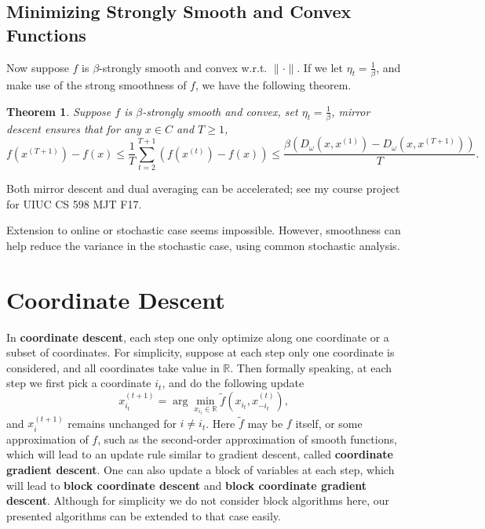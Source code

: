 \documentclass[openany]{book}
\newtheorem{theorem}{Theorem}[chapter]
\theoremstyle{definition}
\theoremstyle{remark}
\begin{document}
\section{Minimizing Strongly Smooth and Convex Functions}
Now suppose $f$ is $\beta$-strongly smooth and convex w.r.t. $\|\cdot\|$. If we let $\eta_t=\frac{1}{\beta}$, and make use of the strong smoothness of $f$, we have the following theorem.
\begin{theorem}
    Suppose $f$ is $\beta$-strongly smooth and convex, set $\eta_t=\frac{1}{\beta}$, mirror descent ensures that for any $x\in C$ and $T\ge1$,
    \begin{equation*}
        f(x^{(T+1)})-f(x)\le\frac{1}{T}\sum_{t=2}^{T+1}\left(f(x^{(t)})-f(x)\right)\le \frac{\beta\left(D_{\omega}(x,x^{(1)})-D_{\omega}(x,x^{(T+1)})\right)}{T}.
    \end{equation*}
\end{theorem}

Both mirror descent and dual averaging can be accelerated; see my course project for UIUC CS 598 MJT F17.

Extension to online or stochastic case seems impossible. However, smoothness can help reduce the variance in the stochastic case, using common stochastic analysis.

\chapter{Coordinate Descent}
In \textbf{coordinate descent}, each step one only optimize along one coordinate or a subset of coordinates. For simplicity, suppose at each step only one coordinate is considered, and all coordinates take value in $\mathbb{R}$. Then formally speaking, at each step we first pick a coordinate $i_t$, and do the following update
\begin{equation}
    x^{(t+1)}_{i_t}=\arg\min_{x_{i_t}\in \mathbb{R}}\tilde{f}(x_{i_t},x^{(t)}_{-i_t}),
\end{equation}
and $x^{(t+1)}_i$ remains unchanged for $i\ne i_t$. Here $\tilde{f}$ may be $f$ itself, or some approximation of $f$, such as the second-order approximation of smooth functions, which will lead to an update rule similar to gradient descent, called \textbf{coordinate gradient descent}. One can also update a block of variables at each step, which will lead to \textbf{block coordinate descent} and \textbf{block coordinate gradient descent}. Although for simplicity we do not consider block algorithms here, our presented algorithms can be extended to that case easily.
\end{document}
